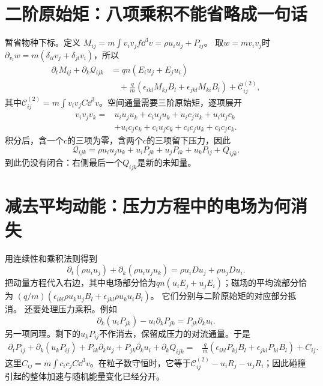 \section{二阶原始矩：八项乘积不能省略成一句话}
暂省物种下标。定义
$M_{ij}=m\int v_iv_jf\dd^3v=\rho u_iu_j+P_{ij}$。
取$w=mv_iv_j$时
$\partial_{v_l}w=m(\delta_{il}v_j+\delta_{jl}v_i)$，所以
\begin{align}
 \partial_tM_{ij}+\partial_k\mathcal Q_{ijk}
 &=qn(E_iu_j+E_ju_i)\\
 &\quad+\frac qm
 (\epsilon_{ikl}M_{kj}B_l+\epsilon_{jkl}M_{ki}B_l)
 +\mathcal C^{(2)}_{ij},\nonumber
\end{align}
其中$\mathcal C^{(2)}_{ij}=m\int v_iv_jC\dd^3v$。空间通量需要三阶原始矩，逐项展开
\begin{align}
 v_iv_jv_k={}&u_iu_ju_k
 +c_iu_ju_k+u_ic_ju_k+u_iu_jc_k\\
 &+u_ic_jc_k+c_iu_jc_k+c_ic_ju_k+c_ic_jc_k.\nonumber
\end{align}
积分后，含一个$c$的三项为零，含两个$c$的三项留下压力，因此
\begin{equation}
 \mathcal Q_{ijk}
 =\rho u_iu_ju_k+u_iP_{jk}+u_jP_{ik}+u_kP_{ij}+Q_{ijk}.
 \label{hall:eq:tutorial-rawthird}
\end{equation}
到此仍没有闭合：右侧最后一个$Q_{ijk}$是新的未知量。

\section{减去平均动能：压力方程中的电场为何消失}
用连续性和乘积法则得到
\begin{equation}
 \partial_t(\rho u_iu_j)+\partial_k(\rho u_iu_ju_k)
 =\rho u_iDu_j+\rho u_jDu_i.
\end{equation}
把动量方程代入右边，其中电场部分恰为$qn(u_iE_j+u_jE_i)$；磁场的平均流部分恰为
$(q/m)(\epsilon_{ikl}\rho u_ku_jB_l+\epsilon_{jkl}\rho u_ku_iB_l)$。
它们分别与二阶原始矩的对应部分抵消。
还要处理压力乘积。例如
\begin{equation}
 \partial_k(u_iP_{jk})-u_i\partial_kP_{jk}
 =P_{jk}\partial_ku_i.
\end{equation}
另一项同理。剩下的$u_kP_{ij}$不作消去，保留成压力的对流通量。于是
\begin{align}
 \partial_tP_{ij}+\partial_k(u_kP_{ij})
 +P_{ik}\partial_ku_j+P_{jk}\partial_ku_i+\partial_kQ_{ijk}
 ={}&\frac qm(\epsilon_{ikl}P_{kj}B_l+\epsilon_{jkl}P_{ki}B_l)
 +C_{ij}.
 \label{hall:eq:pressure}
\end{align}
这里$C_{ij}=m\int c_ic_jC\dd^3v$。在粒子数守恒时，它等于$\mathcal C^{(2)}_{ij}-u_iR_j-u_jR_i$；因此碰撞引起的整体加速与随机能量变化已经分开。

